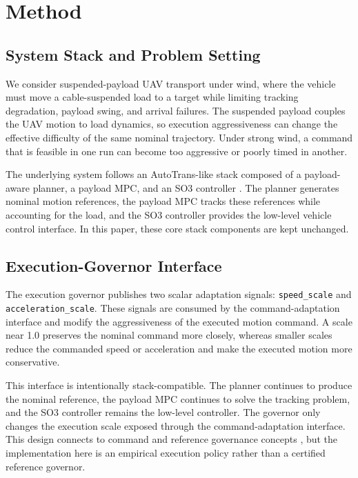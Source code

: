 \section{Method}

\subsection{System Stack and Problem Setting}

We consider suspended-payload UAV transport under wind, where the vehicle must
move a cable-suspended load to a target while limiting tracking degradation,
payload swing, and arrival failures. The suspended payload couples the UAV
motion to load dynamics, so execution aggressiveness can change the effective
difficulty of the same nominal trajectory. Under strong wind, a command that
is feasible in one run can become too aggressive or poorly timed in another.

The underlying system follows an AutoTrans-like stack composed of a
payload-aware planner, a payload MPC, and an SO3 controller
\cite{Li2023AutoTrans,UrbinaBrito2021PredictivePayloadTransport,Lee2010GeometricTrackingSE3}.
The planner generates nominal motion references, the payload MPC tracks these
references while accounting for the load, and the SO3 controller provides the
low-level vehicle control interface. In this paper, these core stack
components are kept unchanged.

\subsection{Execution-Governor Interface}

The execution governor publishes two scalar adaptation signals:
\texttt{speed\_scale} and \texttt{acceleration\_scale}. These signals are
consumed by the command-adaptation interface and modify the aggressiveness of
the executed motion command. A scale near 1.0 preserves the nominal command
more closely, whereas smaller scales reduce the commanded speed or acceleration
and make the executed motion more conservative.

This interface is intentionally stack-compatible. The planner continues to
produce the nominal reference, the payload MPC continues to solve the tracking
problem, and the SO3 controller remains the low-level controller. The governor
only changes the execution scale exposed through the command-adaptation
interface. This design connects to command and reference governance concepts
\cite{Garone2017ReferenceCommandGovernorsSurvey,Garone2016ExplicitReferenceGovernor,Li2021ActionGovernor},
but the implementation here is an empirical execution policy rather than a
certified reference governor.

